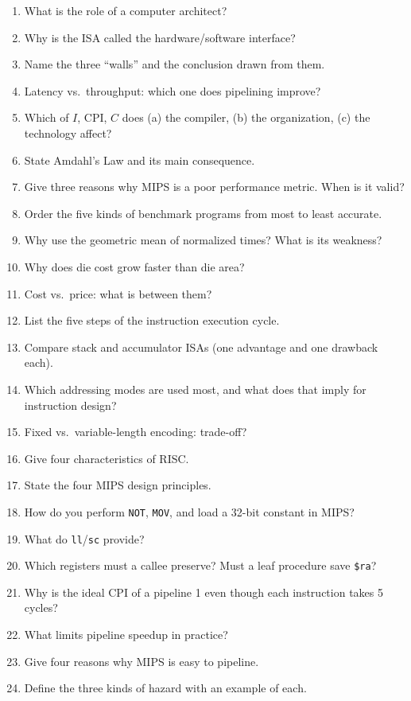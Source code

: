 \documentclass[11pt]{article}
\begin{document}
\begin{enumerate}[label=\textbf{Q\arabic*.},leftmargin=*]
  \item What is the role of a computer architect?
  \item Why is the ISA called the hardware/software interface?
  \item Name the three ``walls'' and the conclusion drawn from them.
  \item Latency vs.\ throughput: which one does pipelining improve?
  \item Which of $I$, CPI, $C$ does (a) the compiler, (b) the organization,
  (c) the technology affect?
  \item State Amdahl's Law and its main consequence.
  \item Give three reasons why MIPS is a poor performance metric. When is it
  valid?
  \item Order the five kinds of benchmark programs from most to least
  accurate.
  \item Why use the geometric mean of normalized times? What is its weakness?
  \item Why does die cost grow faster than die area?
  \item Cost vs.\ price: what is between them?
  \item List the five steps of the instruction execution cycle.
  \item Compare stack and accumulator ISAs (one advantage and one drawback
  each).
  \item Which addressing modes are used most, and what does that imply for
  instruction design?
  \item Fixed vs.\ variable-length encoding: trade-off?
  \item Give four characteristics of RISC.
  \item State the four MIPS design principles.
  \item How do you perform \texttt{NOT}, \texttt{MOV}, and load a 32-bit
  constant in MIPS?
  \item What do \texttt{ll}/\texttt{sc} provide?
  \item Which registers must a callee preserve? Must a leaf procedure save
  \texttt{\$ra}?
  \item Why is the ideal CPI of a pipeline 1 even though each instruction
  takes 5 cycles?
  \item What limits pipeline speedup in practice?
  \item Give four reasons why MIPS is easy to pipeline.
  \item Define the three kinds of hazard with an example of each.

\end{enumerate}
\end{document}

